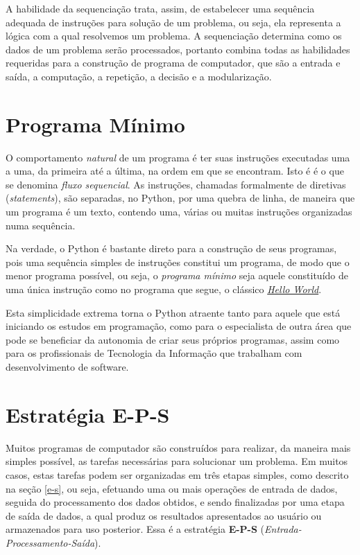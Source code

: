 \documentclass[
]{book}
\begin{document}
A habilidade da sequenciação trata, assim, de estabelecer uma sequência adequada de instruções para solução de um problema, ou seja, ela representa a lógica com a qual resolvemos um problema. A sequenciação determina como os dados de um problema serão processados, portanto combina todas as habilidades requeridas para a construção de programa de computador, que são a entrada e saída, a computação, a repetição, a decisão e a modularização.

\hypertarget{seque-progr}{%
\section{Programa Mínimo}\label{seque-progr}}

O comportamento \emph{natural} de um programa é ter suas instruções executadas uma a uma, da primeira até a última, na ordem em que se encontram. Isto é é o que se denomina \emph{fluxo sequencial}. As instruções, chamadas formalmente de diretivas (\emph{statements}), são separadas, no Python, por uma quebra de linha, de maneira que um programa é um texto, contendo uma, várias ou muitas instruções organizadas numa sequência.

Na verdade, o Python é bastante direto para a construção de seus programas, pois uma sequência simples de instruções constitui um programa, de modo que o menor programa possível, ou seja, o \emph{programa mínimo} seja aquele constituído de uma única instrução como no programa que segue, o clássico \href{https://www.thesoftwareguild.com/blog/the-history-of-hello-world/}{\emph{Hello World}}.

Esta simplicidade extrema torna o Python atraente tanto para aquele que está iniciando os estudos em programação, como para o especialista de outra área que pode se beneficiar da autonomia de criar seus próprios programas, assim como para os profissionais de Tecnologia da Informação que trabalham com desenvolvimento de software.

\hypertarget{seque-e-p-s}{%
\section{Estratégia E-P-S}\label{seque-e-p-s}}

Muitos programas de computador são construídos para realizar, da maneira mais simples possível, as tarefas necessárias para solucionar um problema. Em muitos casos, estas tarefas podem ser organizadas em três etapas simples, como descrito na seção \ref{e-s}, ou seja, efetuando uma ou mais operações de entrada de dados, seguida do processamento dos dados obtidos, e sendo finalizadas por uma etapa de saída de dados, a qual produz os resultados apresentados ao usuário ou armazenados para uso posterior. Essa é a estratégia \textbf{E-P-S} (\emph{Entrada-Processamento-Saída}).
\end{document}
